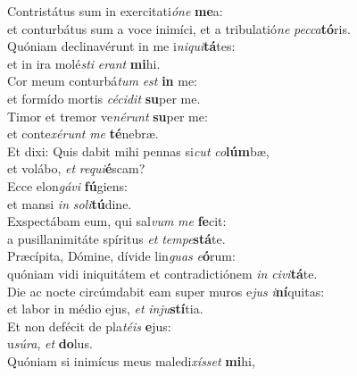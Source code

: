 \evenverse Contristátus sum in exercitati\textit{ó}\textit{ne} \textbf{me}a:~\*\\
\evenverse et conturbátus sum a voce inimíci, et a tribulatió\textit{ne} \textit{pec}\textit{ca}\textbf{tó}ris.\\
\oddverse Quóniam declinavérunt in me i\textit{ni}\textit{qui}\textbf{tá}tes:~\*\\
\oddverse et in ira molé\textit{sti} \textit{e}\textit{rant} \textbf{mi}hi.\\
\evenverse Cor meum conturbá\textit{tum} \textit{est} \textbf{in} me:~\*\\
\evenverse et formído mortis \textit{cé}\textit{ci}\textit{dit} \textbf{su}per me.\\
\oddverse Timor et tremor ve\textit{né}\textit{runt} \textbf{su}per me:~\*\\
\oddverse et conte\textit{xé}\textit{runt} \textit{me} \textbf{té}nebræ.\\
\evenverse Et dixi: Quis dabit mihi pennas si\textit{cut} \textit{co}\textbf{lúm}bæ,~\*\\
\evenverse et volábo, \textit{et} \textit{re}\textit{qui}\textbf{é}scam?\\
\oddverse Ecce elon\textit{gá}\textit{vi} \textbf{fú}giens:~\*\\
\oddverse et mansi \textit{in} \textit{so}\textit{li}\textbf{tú}dine.\\
\evenverse Exspectábam eum, qui sal\textit{vum} \textit{me} \textbf{fe}cit:~\*\\
\evenverse a pusillanimitáte spíritus \textit{et} \textit{tem}\textit{pe}\textbf{stá}te.\\
\oddverse Præcípita, Dómine, dívide lin\textit{guas} \textit{e}\textbf{ó}rum:~\*\\
\oddverse quóniam vidi iniquitátem et contradictiónem \textit{in} \textit{ci}\textit{vi}\textbf{tá}te.\\
\evenverse Die ac nocte circúmdabit eam super muros e\textit{jus} \textit{i}\textbf{ní}quitas:~\*\\
\evenverse et labor in médio ejus, \textit{et} \textit{in}\textit{ju}\textbf{stí}tia.\\
\oddverse Et non defécit de pla\textit{té}\textit{is} \textbf{e}jus:~\*\\
\oddverse u\textit{sú}\textit{ra}, \textit{et} \textbf{do}lus.\\
\evenverse Quóniam si inimícus meus maledi\textit{xís}\textit{set} \textbf{mi}hi,~\*\\
